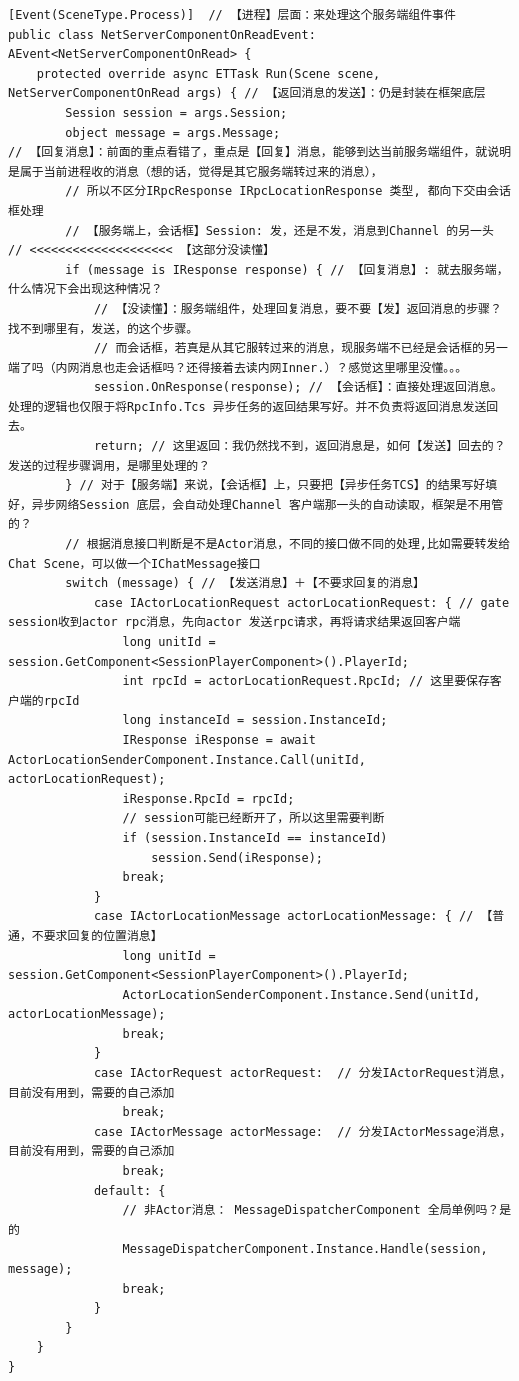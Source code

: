 \documentclass[9pt, b5paper]{article}
\begin{document}
\begin{verbatim}
[Event(SceneType.Process)]  // 【进程】层面：来处理这个服务端组件事件
public class NetServerComponentOnReadEvent: AEvent<NetServerComponentOnRead> {
    protected override async ETTask Run(Scene scene, NetServerComponentOnRead args) { // 【返回消息的发送】：仍是封装在框架底层
        Session session = args.Session;
        object message = args.Message;
// 【回复消息】：前面的重点看错了，重点是【回复】消息，能够到达当前服务端组件，就说明是属于当前进程收的消息（想的话，觉得是其它服务端转过来的消息），
        // 所以不区分IRpcResponse IRpcLocationResponse 类型, 都向下交由会话框处理
        // 【服务端上，会话框】Session: 发，还是不发，消息到Channel 的另一头  // <<<<<<<<<<<<<<<<<<<< 【这部分没读懂】
        if (message is IResponse response) { // 【回复消息】: 就去服务端，什么情况下会出现这种情况？
            // 【没读懂】：服务端组件，处理回复消息，要不要【发】返回消息的步骤？找不到哪里有，发送，的这个步骤。
            // 而会话框，若真是从其它服转过来的消息，现服务端不已经是会话框的另一端了吗（内网消息也走会话框吗？还得接着去读内网Inner.）？感觉这里哪里没懂。。。
            session.OnResponse(response); // 【会话框】：直接处理返回消息。处理的逻辑也仅限于将RpcInfo.Tcs 异步任务的返回结果写好。并不负责将返回消息发送回去。
            return; // 这里返回：我仍然找不到，返回消息是，如何【发送】回去的？发送的过程步骤调用，是哪里处理的？
        } // 对于【服务端】来说，【会话框】上，只要把【异步任务TCS】的结果写好填好，异步网络Session 底层，会自动处理Channel 客户端那一头的自动读取，框架是不用管的？
        // 根据消息接口判断是不是Actor消息，不同的接口做不同的处理,比如需要转发给Chat Scene，可以做一个IChatMessage接口
        switch (message) { // 【发送消息】＋【不要求回复的消息】
            case IActorLocationRequest actorLocationRequest: { // gate session收到actor rpc消息，先向actor 发送rpc请求，再将请求结果返回客户端 
                long unitId = session.GetComponent<SessionPlayerComponent>().PlayerId;
                int rpcId = actorLocationRequest.RpcId; // 这里要保存客户端的rpcId
                long instanceId = session.InstanceId;
                IResponse iResponse = await ActorLocationSenderComponent.Instance.Call(unitId, actorLocationRequest);
                iResponse.RpcId = rpcId;
                // session可能已经断开了，所以这里需要判断
                if (session.InstanceId == instanceId) 
                    session.Send(iResponse);
                break;
            }
            case IActorLocationMessage actorLocationMessage: { // 【普通，不要求回复的位置消息】
                long unitId = session.GetComponent<SessionPlayerComponent>().PlayerId;
                ActorLocationSenderComponent.Instance.Send(unitId, actorLocationMessage);
                break;
            }
            case IActorRequest actorRequest:  // 分发IActorRequest消息，目前没有用到，需要的自己添加 
                break;
            case IActorMessage actorMessage:  // 分发IActorMessage消息，目前没有用到，需要的自己添加 
                break;
            default: {
                // 非Actor消息： MessageDispatcherComponent 全局单例吗？是的
                MessageDispatcherComponent.Instance.Handle(session, message);
                break;
            }
        }
    }
}
\end{verbatim}
\end{document}
